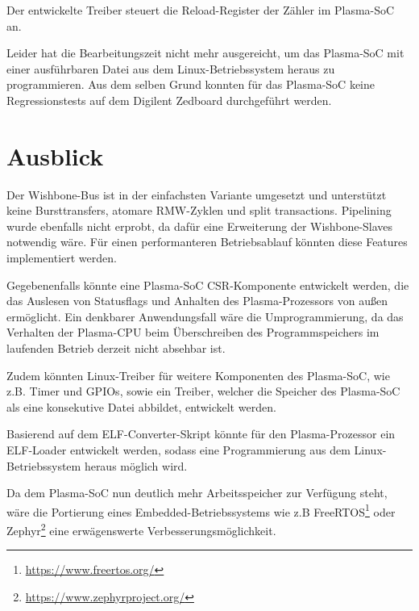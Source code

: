 Der entwickelte Treiber steuert die Reload-Register der Zähler im Plasma-\gls{SoC} an. 

Leider hat die Bearbeitungszeit nicht mehr ausgereicht, um das Plasma-\gls{SoC} mit einer ausführbaren Datei aus dem Linux-Betriebssystem heraus zu programmieren. Aus dem selben Grund konnten für das Plasma-\gls{SoC} keine Regressionstests auf dem Digilent Zedboard durchgeführt werden. 
  
\section{Ausblick}

Der Wishbone-Bus ist in der einfachsten Variante umgesetzt und unterstützt keine Bursttransfers, atomare \Gls{RMW}-Zyklen und split transactions. Pipelining wurde ebenfalls nicht erprobt, da dafür eine Erweiterung der Wishbone-Slaves notwendig wäre. Für einen performanteren Betriebsablauf könnten diese Features implementiert werden. 

Gegebenenfalls könnte eine Plasma-\gls{SoC} \gls{CSR}-Komponente entwickelt werden, die das Auslesen von Statusflags und Anhalten des Plasma-Prozessors von außen ermöglicht. Ein denkbarer Anwendungsfall wäre die Umprogrammierung, da das Verhalten der Plasma-\gls{CPU} beim Überschreiben des Programmspeichers im laufenden Betrieb derzeit nicht absehbar ist. 

Zudem könnten Linux-Treiber für weitere Komponenten des Plasma-\gls{SoC}, wie z.B. Timer und \glspl{GPIO}, sowie ein Treiber, welcher die Speicher des Plasma-\gls{SoC} als eine konsekutive Datei abbildet, entwickelt werden. 

Basierend auf dem \gls{ELF}-Converter-Skript könnte für den Plasma-Prozessor ein \gls{ELF}-Loader entwickelt werden, sodass eine Programmierung aus dem Linux-Betriebssystem heraus möglich wird. 

Da dem Plasma-\gls{SoC} nun deutlich mehr Arbeitsspeicher zur Verfügung steht, wäre die Portierung eines Embedded-Betriebssystems wie z.B FreeRTOS\footnote{\url{https://www.freertos.org/}} oder Zephyr\footnote{\url{https://www.zephyrproject.org/}} eine erwägenswerte Verbesserungsmöglichkeit. 


